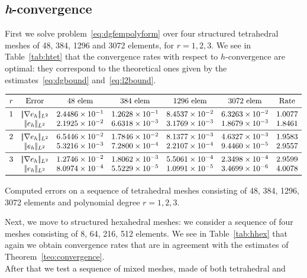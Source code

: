 \documentclass[12pt, a4paper]{article}
\theoremstyle{definition}
\theoremstyle{plain}
\theoremstyle{plain}
\theoremstyle{definition}
\begin{document}
\subsection{\textit{h}-convergence}
First we solve problem~\eqref{eq:dgfempolyform} over four structured 
tetrahedral meshes of 48, 
384, 1296 and 3072 elements, for $r=1,2,3$. We see in Table~\ref{tab:htet} that the 
convergence rates with respect to $h$-convergence are optimal: they correspond 
to the theoretical ones given by the estimates~\eqref{eq:dgbound} 
and~\eqref{eq:l2bound}.\\
\begin{table}[h]\footnotesize
	\centering
	\[
	\begin{array}{ccccccc}
	\toprule
	r & \text{Error} & \text{48 elem} & \text{384 elem} & \text{1296 elem} & 
	\text{3072 elem} & \text{Rate} \\ 
	\midrule
	1 & |\!|\nabla e_{h}|\!|_{L^2}   & 2.4486 \times 10^{-1} & 1.2628 \times 10^{-1} & 8.4537 \times 10^{-2} & 6.3263 \times 10^{-2} & 1.0077\\
	& |\!|e_{h}|\!|_{L^2} & 2.1925 \times 10^{-2} & 6.6318 \times 10^{-3} & 3.1769 \times 10^{-3} & 1.8679 \times 10^{-3} & 1.8461\\
	\midrule
	2 & |\!|\nabla e_{h}|\!|_{L^2}   & 6.5446 \times 10^{-2} & 1.7846 \times 10^{-2} & 8.1377 \times 10^{-3} & 4.6327 \times 10^{-3} & 1.9583\\
	& |\!|e_{h}|\!|_{L^2} & 5.3216 \times 10^{-3} & 7.2800 \times 10^{-4} & 2.2107 \times 10^{-4} & 9.4460 \times 10^{-5} & 2.9557\\
	\midrule
	3 & |\!|\nabla e_{h}|\!|_{L^2}   & 1.2746 \times 10^{-2} & 1.8062 \times 10^{-3} & 5.5061 \times 10^{-4} & 2.3498 \times 10^{-4} & 2.9599\\
	& |\!|e_{h}|\!|_{L^2} & 8.0974 \times 10^{-4} & 5.5229 \times 10^{-5} & 1.0991 \times 10^{-5} & 3.4699 \times 10^{-6} & 4.0078\\
	\bottomrule
	\end{array}
	\]
	\caption{Computed errors on a sequence of tetrahedral meshes consisting of 
	48, 384, 1296, 3072 elements and polynomial degree $r=1,2,3$.} \label{tab:htet}
\end{table}
Next, we move to structured hexahedral meshes: we consider a sequence of four 
meshes consisting of 8, 64, 216, 512 elements. We see in 
Table~\ref{tab:hhex} that again we obtain convergence rates that are in 
agreement with the estimates of Theorem~\ref{teo:convergence}.\\
After that we test a sequence of mixed meshes, made of both tetrahedral and 
\end{document}
